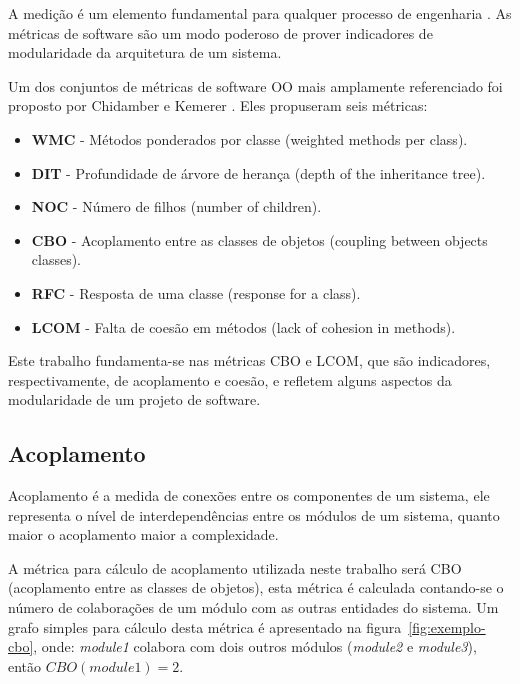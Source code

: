 A medição é um elemento fundamental para qualquer processo de engenharia
\cite{engenhariaDeSoftwarePressman}. As métricas de software são um modo
poderoso de prover indicadores de modularidade da arquitetura de um
sistema\cite{OntheModular}. 

Um dos conjuntos de métricas de software OO
mais amplamente referenciado foi proposto por Chidamber e Kemerer
\cite{engenhariaDeSoftwarePressman}. Eles propuseram seis métricas:

\begin{itemize}

\item {\bf WMC} -
Métodos ponderados por classe (weighted methods per class).

\item {\bf DIT} -
Profundidade de árvore de herança (depth of the inheritance tree).

\item {\bf NOC} -
Número de filhos (number of children).

\item {\bf CBO} -
Acoplamento entre as classes de objetos (coupling between objects classes).

\item {\bf RFC} -
Resposta de uma classe (response for a class).

\item {\bf LCOM} -
Falta de coesão em métodos (lack of cohesion in methods).

\end{itemize}

Este trabalho fundamenta-se nas métricas CBO e LCOM, que são
indicadores, respectivamente, de
acoplamento e coesão, e refletem alguns aspectos da modularidade de um projeto de
software.

\subsection{Acoplamento}

Acoplamento é a medida de conexões entre os componentes de um
sistema, ele representa o nível de interdependências entre os módulos de um
sistema, quanto maior o acoplamento maior a complexidade.

A métrica para cálculo de acoplamento utilizada neste trabalho será CBO
(acoplamento entre as classes de objetos), esta métrica é calculada contando-se
o número de colaborações de um módulo com as outras entidades do sistema.  Um
grafo simples para cálculo desta métrica é apresentado na
figura~\ref{fig:exemplo-cbo}, onde: {\it module1} colabora com dois outros
módulos ({\it module2} e {\it module3}), então $CBO(module1) = 2$.

